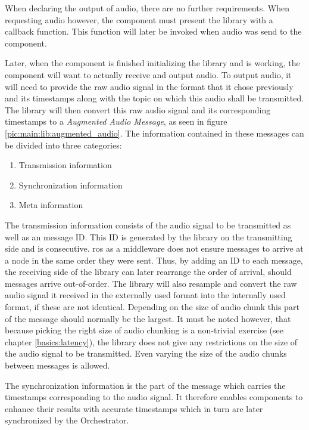 When declaring the output of audio, there are no further requirements.
When requesting audio however, the component must present the library with a callback function.
This function will later be invoked when audio was send to the component.

\label{main:lib:augmented_audio_msg}
Later, when the component is finished initializing the library and is working, %
the component will want to actually receive and output audio.
To output audio, it will need to provide the raw audio signal in the format that it chose previously and its timestamps along with the topic on which this audio shall be transmitted.
The library will then convert this raw audio signal and its corresponding timestamps to a \textit{Augmented Audio Message}, as seen in figure \ref{pic:main:lib:augmented_audio}.
The information contained in these messages can be divided into three categories:
\begin{enumerate}
	\item Transmission information
	\item Synchronization information
	\item Meta information
\end{enumerate}
The transmission information consists of the audio signal to be transmitted as well as an message ID.
This ID is generated by the library on the transmitting side and is consecutive.
\gls{ros} as a middleware does not ensure messages to arrive at a node in the same order they were sent.
Thus, by adding an ID to each message, the receiving side of the library can later rearrange the order of arrival, should messages arrive out-of-order.
The library will also resample and convert the raw audio signal it received in the externally used format into the internally used format, if these are not identical.
Depending on the size of audio chunk this part of the message should normally be the largest.
It must be noted however, that because picking the right size of audio chunking is a non-trivial exercise (see chapter \ref{basics:latency}), the library does not give any restrictions on the size of the audio signal to be transmitted.
Even varying the size of the audio chunks between messages is allowed.  

The synchronization information is the part of the message which carries the timestamps corresponding to the audio signal.
It therefore enables components to enhance their results with accurate timestamps which in turn are later synchronized by the Orchestrator.

